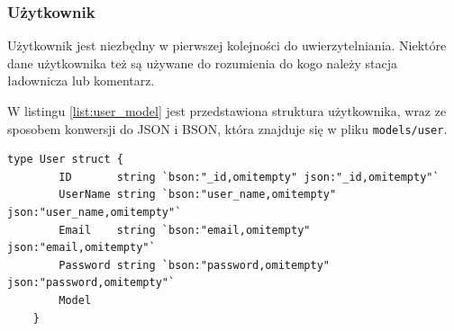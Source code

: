 \subsubsection{Użytkownik}
Użytkownik jest niezbędny w pierwszej kolejności do uwierzytelniania. Niektóre dane użytkownika też są używane do rozumienia do kogo należy stacja ładownicza lub komentarz.

W listingu \ref{list:user_model} jest przedstawiona struktura użytkownika, wraz ze sposobem konwersji do JSON i BSON, która znajduje się w pliku \texttt{models/user}.
\begin{lstlisting}[label=list:user_model,caption=Model danych użytkownika,basicstyle=\tiny\ttfamily]
    type User struct {
        ID       string `bson:"_id,omitempty" json:"_id,omitempty"`
        UserName string `bson:"user_name,omitempty" json:"user_name,omitempty"`
        Email    string `bson:"email,omitempty" json:"email,omitempty"`
        Password string `bson:"password,omitempty" json:"password,omitempty"`
        Model
    }
\end{lstlisting}

% 


